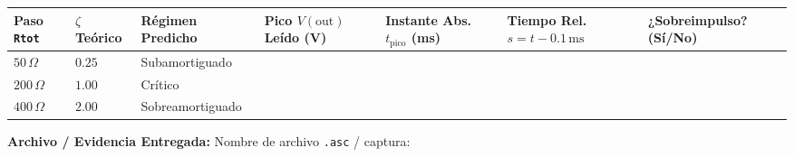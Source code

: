 \documentclass[11pt, a4paper]{article}
\begin{document}
\vspace{0.2cm}
\renewcommand{\arraystretch}{1.65}
\noindent
\begin{tabularx}{\textwidth}{
  >{\centering\arraybackslash\hsize=0.65\hsize}X
  >{\centering\arraybackslash\hsize=0.65\hsize}X
  >{\centering\arraybackslash\hsize=0.85\hsize}X
  >{\centering\arraybackslash\hsize=1.05\hsize}X
  >{\centering\arraybackslash\hsize=1.05\hsize}X
  >{\centering\arraybackslash\hsize=0.75\hsize}X
  >{\RaggedRight\arraybackslash\hsize=1.00\hsize}X}
\toprule
\textbf{Paso \texttt{Rtot}} & \textbf{$\zeta$ Teórico} & \textbf{Régimen Predicho} & \textbf{Pico $V(\text{out})$ Leído (V)} & \textbf{Instante Abs. $t_{\text{pico}}$ (ms)} & \textbf{Tiempo Rel. $s = t - 0.1\,\text{ms}$} & \textbf{¿Sobreimpulso? (Sí/No)} \\
\midrule
$50\,\Omega$  & $0.25$ & Subamortiguado   & & & & \\[0.3cm]
$200\,\Omega$ & $1.00$ & Crítico          & & & & \\[0.3cm]
$400\,\Omega$ & $2.00$ & Sobreamortiguado & & & & \\[0.3cm]
\bottomrule
\end{tabularx}

\vspace{0.25cm}
\noindent\textbf{Archivo / Evidencia Entregada:} Nombre de archivo \texttt{.asc} / captura: \hrulefill
\end{document}
